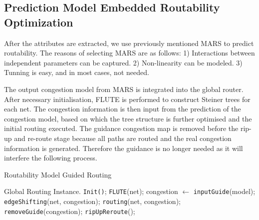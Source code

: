 \subsection{Prediction Model Embedded Routability Optimization}
After the attributes are extracted, we use previously mentioned MARS \cite{MARS} to predict routability. The reasons of selecting MARS are as follows: 1) Interactions between independent parameters can be captured. 2) Non-linearity can be modeled. 3) Tunning is easy, and in most cases, not needed. 

The output congestion model from MARS is integrated into the global router. After necessary initialisation, FLUTE is performed to construct Steiner trees for each net. The congestion information is then input from the prediction of the congestion model, based on which the tree structure is further optimised and the initial routing executed. The guidance congestion map is removed before the rip-up and re-route stage because all paths are routed and the real congestion information is generated. Therefore the guidance is no longer needed as it will interfere the following process.

\begin{algorithm}
    \caption{Routability Model Guided Routing}
    \label{alg:route}
    \begin{algorithmic}[1]
        \Require Global Routing Instance.
        \State \texttt{Init()};
            \State \texttt{FLUTE}(net);
            \State congestion $\gets$ \texttt{inputGuide}(model);
            \State \texttt{edgeShifting}(net, congestion);
            \State \texttt{routing}(net, congestion);
            \State \texttt{removeGuide}(congestion);
                \State \texttt{ripUpReroute}();
            \EndWhile
        \EndWhile
    \end{algorithmic}
\end{algorithm}

    
  
